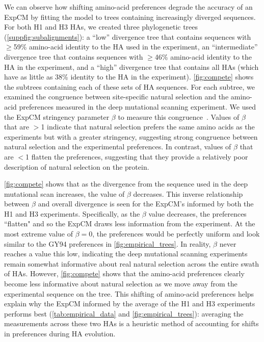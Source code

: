 \documentclass[11pt]{article}
\begin{document}
We can observe how shifting amino-acid preferences degrade the accuracy of an ExpCM by fitting the model to trees containing increasingly diverged sequences.
For both H1 and H3 HAs, we created three phylogenetic trees (\ref{suppfig:subalignments}): a ``low'' divergence tree that contains sequences with $\ge$59\% amino-acid identity to the HA used in the experiment, an ``intermediate'' divergence tree that contains sequences with $\ge$46\% amino-acid identity to the HA in the experiment, and a ``high'' divergence tree that contains all HAs (which have as little as 38\% identity to the HA in the experiment).
\ref{fig:compete} shows the subtrees containing each of these sets of HA sequences.
For each subtree, we examined the congruence between site-specific natural selection and the amino-acid preferences measured in the deep mutational scanning experiment. 
We used the ExpCM stringency parameter $\beta$ to measure this congruence~\citep{bloom2014informed,hilton2017phydms}. 
Values of $\beta$ that are $>$1 indicate that natural selection prefers the same amino acids as the experiments but with a greater stringency, suggesting strong congruence between natural selection and the experimental preferences. 
In contrast, values of $\beta$ that are $<$1 flatten the preferences, suggesting that they provide a relatively poor description of natural selection on the protein.

\ref{fig:compete} shows that as the divergence from the sequence used in the deep mutational scan increases, the value of $\beta$ decreases. 
This inverse relationship between $\beta$ and overall divergence is seen for the ExpCM's informed by both the H1 and H3 experiments.
Specifically, as the $\beta$ value decreases, the preferences ``flatten" and so the ExpCM draws less information from the experiment. 
At the most extreme value of $\beta = 0$, the preferences would be perfectly uniform and look similar to the GY94 preferences in \ref{fig:empirical_trees}.
In reality, $\beta$ never reaches a value this low, indicating the deep mutational scanning experiments remain somewhat informative about real natural selection across the entire swath of HAs. 
However, \ref{fig:compete} shows that the amino-acid preferences clearly become less informative about natural selection as we move away from the experimental sequence on the tree.
This shifting of amino-acid preferences helps explain why the ExpCM informed by the average of the H1 and H3 experiments performs best (\ref{tab:empirical_data} and \ref{fig:empirical_trees}): averaging the measurements across these two HAs is a heuristic method of accounting for shifts in preferences during HA evolution. 
 
\end{document}
